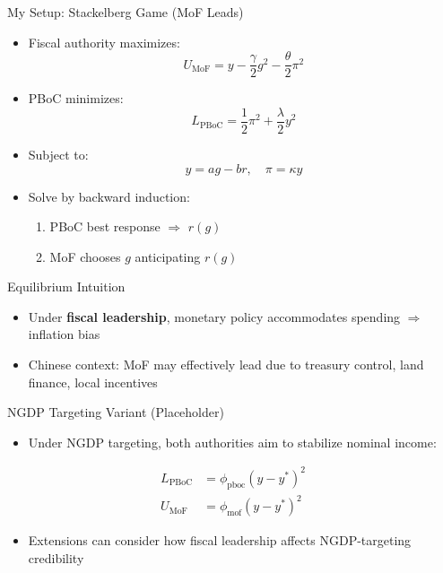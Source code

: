 \documentclass{beamer}
\begin{document}
\begin{frame}{My Setup: Stackelberg Game (MoF Leads)}
\begin{itemize}
    \item Fiscal authority maximizes:
    \[ U_{\text{MoF}} = y - \frac{\gamma}{2}g^2 - \frac{\theta}{2}\pi^2 \]
    \item PBoC minimizes:
    \[ L_{\text{PBoC}} = \frac{1}{2}\pi^2 + \frac{\lambda}{2}y^2 \]
    \item Subject to:
    \[ y = a g - b r, \quad \pi = \kappa y \]
\end{itemize}
\begin{itemize}
    \item Solve by backward induction:
    \begin{enumerate}
        \item PBoC best response $\Rightarrow$ $r(g)$
        \item MoF chooses $g$ anticipating $r(g)$
    \end{enumerate}
\end{itemize}
\end{frame}

\begin{frame}{Equilibrium Intuition}
\begin{itemize}
    \item Under \textbf{fiscal leadership}, monetary policy accommodates spending $\Rightarrow$ inflation bias
    \item Chinese context: MoF may effectively lead due to treasury control, land finance, local incentives
\end{itemize}
\end{frame}

\begin{frame}{NGDP Targeting Variant (Placeholder)}
\begin{itemize}
    \item Under NGDP targeting, both authorities aim to stabilize nominal income:
\end{itemize}
\begin{align*}
    L_{\text{PBoC}} &= \phi_{\text{pboc}} (y - y^*)^2 \\
    U_{\text{MoF}} &= \phi_{\text{mof}} (y - y^*)^2
\end{align*}
\begin{itemize}
    \item Extensions can consider how fiscal leadership affects NGDP-targeting credibility
\end{itemize}
\end{frame}
\end{document}
